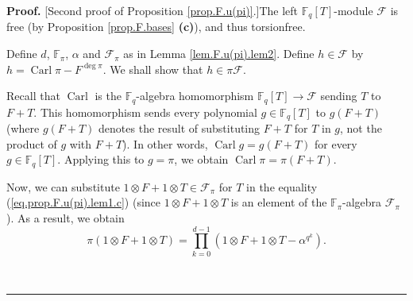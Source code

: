 \documentclass[numbers=enddot,12pt,final,onecolumn,notitlepage]{scrartcl}%
\theoremstyle{definition}
\newenvironment{proof}[1][Proof]{\noindent\textbf{#1.} }{\ \rule{0.5em}{0.5em}}
\let\prodnonlimits\prod
\renewcommand{\prod}{\prodnonlimits\limits}
\begin{document}
\begin{proof}
[Second proof of Proposition \ref{prop.F.u(pi)}.]The left $\mathbb{F}%
_{q}\left[  T\right]  $-module $\mathcal{F}$ is free (by Proposition
\ref{prop.F.bases} \textbf{(c)}), and thus torsionfree.

Define $d$, $\mathbb{F}_{\pi}$, $\alpha$ and $\mathcal{F}_{\pi}$ as in Lemma
\ref{lem.F.u(pi).lem2}. Define $h\in\mathcal{F}$ by $h=\operatorname*{Carl}%
\pi-F^{\deg\pi}$. We shall show that $h\in\pi\mathcal{F}$.

Recall that $\operatorname*{Carl}$ is the $\mathbb{F}_{q}$-algebra
homomorphism $\mathbb{F}_{q}\left[  T\right]  \rightarrow\mathcal{F}$ sending
$T$ to $F+T$. This homomorphism sends every polynomial $g\in\mathbb{F}%
_{q}\left[  T\right]  $ to $g\left(  F+T\right)  $ (where $g\left(
F+T\right)  $ denotes the result of substituting $F+T$ for $T$ in $g$, not the
product of $g$ with $F+T$). In other words, $\operatorname*{Carl}g=g\left(
F+T\right)  $ for every $g\in\mathbb{F}_{q}\left[  T\right]  $. Applying this
to $g=\pi$, we obtain $\operatorname*{Carl}\pi=\pi\left(  F+T\right)  $.

Now, we can substitute $1\otimes F+1\otimes T\in\mathcal{F}_{\pi}$ for $T$ in
the equality (\ref{eq.prop.F.u(pi).lem1.c}) (since $1\otimes F+1\otimes T$ is
an element of the $\mathbb{F}_{\pi}$-algebra $\mathcal{F}_{\pi}$). As a
result, we obtain%
\begin{equation}
\pi\left(  1\otimes F+1\otimes T\right)  =\prod_{k=0}^{d-1}\left(  1\otimes
F+1\otimes T-\alpha^{q^{k}}\right)  . \label{pf.prop.F.u(pi).2nd.1}%
\end{equation}



\end{proof}
\end{document}
